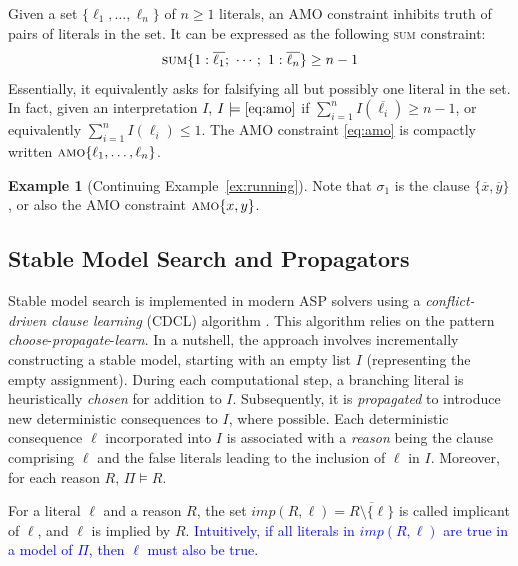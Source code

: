 \documentclass[preprint,authoryear]{elsarticle}
\theoremstyle{definition}
\newtheorem{example}{Example}[section]
\begin{document}
Given a set $\{\ell_1, \ldots, \ell_n\}$ of $n \geq 1$ literals, an \textsc{AMO} constraint inhibits truth of pairs of literals in the set.
It can be expressed as the following \textsc{sum} constraint:
\begin{align}\label{eq:amo}
    \textsc{sum}\{1 : \overline{\ell_1};\ \cdots;\ 1 : \overline{\ell_n}\} \geq n - 1
\end{align}
Essentially, it equivalently asks for falsifying all but possibly one literal in the set.
In fact, given an interpretation $I$, $I \models \eqref{eq:amo}$ if 
$\sum_{i = 1}^{n}{I(\overline{\ell_i})} \geq n - 1$, or equivalently
$\sum_{i = 1}^{n}{I(\ell_i)} \leq 1$.
The \textsc{AMO} constraint \eqref{eq:amo} is compactly written $\textsc{amo}\{\ell_1,\ldots,\ell_n\}$.

\begin{example}[Continuing Example~\ref{ex:running}]
Note that $\sigma_1$ is the clause $\{\overline{x}, \overline{y}\}$, or also the AMO constraint $\textsc{amo}\{x, y\}$.
\end{example}


\subsection{Stable Model Search and Propagators}\label{sec:propagators}
Stable model search is implemented in modern ASP solvers using a \emph{conflict-driven clause learning} (CDCL) algorithm \citep{DBLP:journals/ai/GebserKS12}.
This algorithm relies on the pattern \textit{choose}-\textit{propagate}-\textit{learn}.
In a nutshell, the approach involves incrementally constructing a stable model, starting with an empty list $I$ (representing the empty assignment).
%
During each computational step, a branching literal is heuristically \textit{chosen} for addition to $I$.
Subsequently, it is \emph{propagated} to introduce new deterministic consequences to $I$, where possible. 
Each deterministic consequence $\ell$ incorporated into $I$ is associated with a \emph{reason} being the clause comprising $\ell$ and the false literals leading to the inclusion of $\ell$ in $I$.
Moreover, for each reason $R$, $\Pi \models R$.

For a literal $\ell$ and a reason $R$, the set $\mathit{imp}(R, \ell) = \overline{R\setminus\{\ell\}}$ is called implicant of $\ell$, and $\ell$ is implied by $R$.
\textcolor{blue}{Intuitively, if all literals in $\mathit{imp}(R,\ell)$ are true in a model of $\Pi$, then $\ell$ must also be true.}
\end{document}
